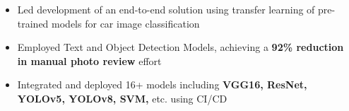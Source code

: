 \documentclass[a4paper,10pt]{article}
\newcommand{\isep}{-2 pt}
\begin{document}
\begin{itemize}
\begin{itemize}
        \item Led development of an end-to-end solution using transfer learning of pre-trained models for car image classification
        
        \item Employed Text and Object Detection Models, achieving a \textbf{92\% reduction in manual photo review} effort
        
        \item Integrated and deployed 16+ models including \textbf{VGG16, ResNet, YOLOv5, YOLOv8, SVM,} etc. using CI/CD
        
        
       
    \end{itemize}


\end{itemize}
\end{document}
